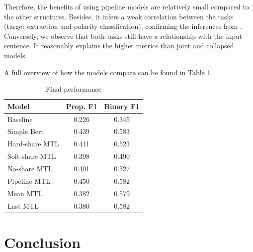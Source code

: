 \documentclass[11pt,a4paper]{article}
\begin{document}
Therefore, the benefits of using pipeline models are relatively small compared to the other structures. Besides, it infers a weak correlation between the tasks (target extraction and polarity classification), confirming the inferences from \cite{hu-etal-2019-open}. Conversely, we observe that both tasks still have a relationship with the input sentence. It reasonably explains the higher metrics than joint and collapsed models.

A full overview of how the models compare can be found in Table \ref{tab:finalresults}

\begin{table}[!htb]
    \centering
    \begin{tabular}{l|c|c}
    \textbf{Model} & \textbf{Prop. F1} & \textbf{Binary F1}\\
    \hline
      Baseline                      & 0.226  & 0.345 \\ %
      Simple Bert                   & 0.439  & 0.583\\
      Hard-share MTL                & 0.411  & 0.523 \\
      Soft-share MTL                & 0.398  & 0.490 \\
      No-share MTL                  & 0.401  & 0.527 \\
      Pipeline MTL                  & 0.450  & 0.582\\
      Mean MTL                      & 0.382  & 0.579\\
      Last MTL                      & 0.380  & 0.582\\
    \end{tabular}
    \caption{Final performance}
    \label{tab:finalresults}
\end{table}





\section{Conclusion}
\label{sec:conclusion}
\end{document}
